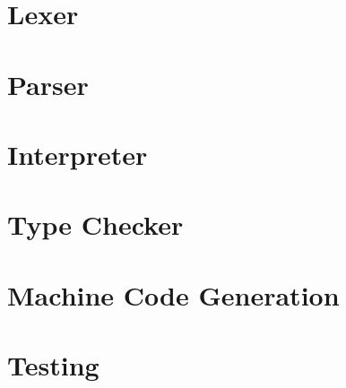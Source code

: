 \documentclass[a4paper,fleqn]{report}
\begin{document}

\tableofcontents
\chapter{Lexer}

\chapter{Parser}

\chapter{Interpreter}

\chapter{Type Checker}

\chapter{Machine Code Generation}

\chapter{Testing}

\end{document}
